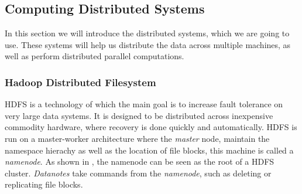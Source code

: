\subsection{Computing Distributed Systems}\label{sec:distributed}
In this section we will introduce the distributed systems, which we are going to use. These systems will help us distribute the data across multiple machines, as well as perform distributed parallel computations. 

\subsubsection{Hadoop Distributed Filesystem}\label{sec:hadoopfilesystem}
HDFS is a technology of which the main goal is to increase fault tolerance on very large data systems. It is designed to be distributed across inexpensive commodity hardware, where recovery is done quickly and automatically. HDFS is run on a master-worker architecture where the \emph{master} node, maintain the namespace hierachy as well as the location of file blocks, this machine is called a \emph{namenode}. As shown in , the namenode can be seen as the root of a HDFS cluster. \emph{Datanotes} take commands from the \emph{namenode}, such as deleting or replicating file blocks.

